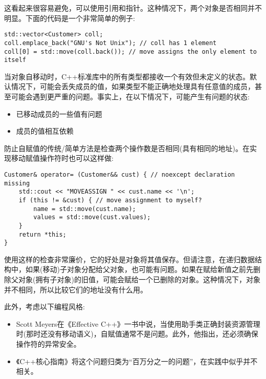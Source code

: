 这看起来很容易避免，可以使用引用和指针。这种情况下，两个对象是否相同并不明显。下面的代码是一个非常简单的例子:\par

\begin{lstlisting}[caption={}]
std::vector<Customer> coll;
coll.emplace_back("GNU's Not Unix"); // coll has 1 element
coll[0] = std::move(coll.back()); // move assigns the only element to itself
\end{lstlisting}

当对象自移动时，C++标准库中的所有类型都接收一个有效但未定义的状态。默认情况下，可能会丢失成员的值，如果类型不能正确地处理具有任意值的成员，甚至可能会遇到更严重的问题。事实上，在以下情况下，可能产生有问题的状态:\par

\begin{itemize}
	\item 已移动成员的一些值有问题
	\item 成员的值相互依赖
\end{itemize}

防止自赋值的传统/简单方法是检查两个操作数是否相同(具有相同的地址)。在实现移动赋值操作符时也可以这样做:\par

\begin{lstlisting}[caption={}]
Customer& operator= (Customer&& cust) { // noexcept declaration missing
	std::cout << "MOVEASSIGN " << cust.name << '\n';
	if (this != &cust) { // move assignment to myself?
		name = std::move(cust.name);
		values = std::move(cust.values);
	}
	return *this;
}
\end{lstlisting}

使用这样的检查非常廉价，它的好处是对象将其值保存。但请注意，在递归数据结构中，如果(移动)子对象分配给父对象，也可能有问题。如果在赋给新值之前先删除父对象(拥有子对象)的旧值，可能会赋给一个已删除的对象。这种情况下，对象并不相同，所以比较它们的地址没有什么用。\par

此外，考虑以下编程风格:\par

\begin{itemize}
	\item Scott Meyers在《Effective C++》一书中说，当使用助手类正确封装资源管理时(那时还没有移动语义)，自赋值通常不是问题。此外，他指出，还必须确保操作符的异常安全。
	\item 《C++核心指南》将这个问题归类为“百万分之一的问题”，在实践中似乎并不相关。
\end{itemize}

